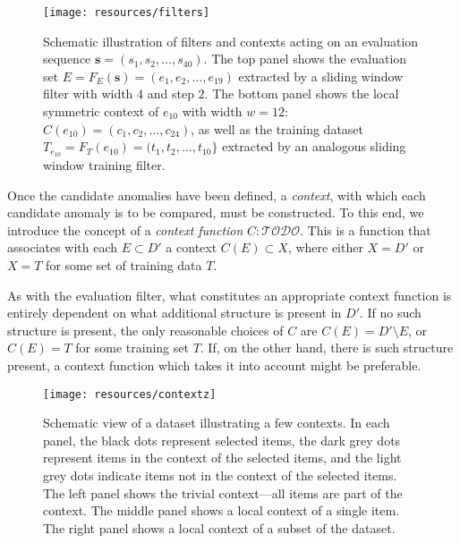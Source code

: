 \begin{figure}[htb]
    \begin{center}
        \texttt{[image: resources/filters]}
    \end{center}
\caption{{\small Schematic illustration of filters and contexts acting on an evaluation sequence $\mathbf{s} = (s_1, s_2, \dots, s_{40})$. The top panel shows the evaluation set $E = F_E(\mathbf{s}) = (e_1, e_2, \dots, e_{19})$ extracted by a sliding window filter with width $4$ and step $2$. The bottom panel shows the local symmetric context of $e_{10}$ with width $w = 12$: $C(e_{10}) = (c_1, c_2, \dots, c_{24})$, as well as the training dataset $T_{e_{10}} = F_T(e_{10}) = (t_1, t_2, \dots, t_{10}\}$ extracted by an analogous sliding window training filter.}}
\label{fig:filters}
\end{figure}

Once the candidate anomalies have been defined, a \emph{context}, with which each candidate anomaly is to be compared, must be constructed. To this end, we introduce the concept of a \emph{context function} $C: \mathcal{TODO}$. This is a function that associates with each $E \subset D'$ a context $C(E) \subset X$, where either $X = D'$ or $X = T$ for some set of training data $T$.

As with the evaluation filter, what constitutes an appropriate context function is entirely dependent on what additional structure is present in $D'$. If no such structure is present, the only reasonable choices of $C$ are $C(E) = D' \setminus E$, or $C(E) = T$ for some training set $T$. If, on the other hand, there is such structure present, a context function which takes it into account might be preferable.

\begin{figure}[thb]
    \vspace{-4pt}
    \begin{center}
        \leavevmode
        \texttt{[image: resources/contextz]}
    \end{center}
    \vspace{-15pt}
    \caption{{\small Schematic view of a dataset illustrating a few contexts. In each panel, the black dots represent selected items, the dark grey dots represent items in the context of the selected items, and the light grey dots indicate items not in the context of the selected items. The left panel shows the trivial context---all items are part of the context. The middle panel shows a local context of a single item. The right panel shows a local context of a subset of the dataset.}}
\label{fig:contexts}
    \vspace{-5pt}
\end{figure}

